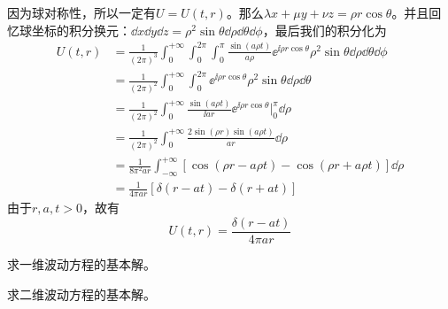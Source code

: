 \begin{problembox}
\begin{solution}
        因为球对称性，所以一定有$U = U(t, r)$。那么$\lambda x + \mu y + \nu z = \rho r \cos \theta$。并且回忆球坐标的积分换元：$\dd{x} \dd{y} \dd{z} = \rho^2 \sin\theta \dd{\rho} \dd{\theta} \dd{\phi}$，最后我们的积分化为
        \begin{align*}
            U(t, r) &= \frac{1}{\left(2 \pi\right)^3} \int_{0}^{+\infty} \int_{0}^{2 \pi} \int_{0}^{\pi} \frac{\sin(a \rho t)}{a \rho} \ee^{\ii \rho r \cos \theta} \rho^2 \sin\theta \dd{\rho} \dd{\theta} \dd{\phi}\\
            &= \frac{1}{\left(2 \pi\right)^2} \int_{0}^{+\infty} \int_{0}^{2 \pi} \ee^{\ii \rho r \cos \theta} \rho^2 \sin\theta \dd{\rho} \dd{\theta}\\
            &= \frac{1}{\left(2 \pi\right)^2} \int_{0}^{+\infty} \frac{\sin(a \rho t)}{\ii a r} \ee^{\ii \rho r \cos \theta}|_{0}^{\pi} \dd{\rho}\\
            &= \frac{1}{\left(2 \pi\right)^2} \int_{0}^{+\infty} \frac{2 \sin(\rho r) \sin(a \rho t)}{a r} \dd{\rho}\\
            &= \frac{1}{8 \pi^2 a r} \int_{-\infty}^{+\infty} \left[\cos(\rho r - a \rho t) - \cos(\rho r  + a \rho t)\right] \dd{\rho}\\
            &= \frac{1}{4 \pi a r}\left[\delta(r - at) -\delta(r + at)\right]
        \end{align*}
        由于$r, a, t > 0$，故有
        \[U(t, r) = \frac{\delta(r - at)}{4 \pi a r}\]
    \end{solution}
\end{problembox}
\begin{problembox}
    \begin{exercise}
        求一维波动方程的基本解。
    \end{exercise}
    \begin{exercise}
        求二维波动方程的基本解。
    \end{exercise}
\end{problembox}
